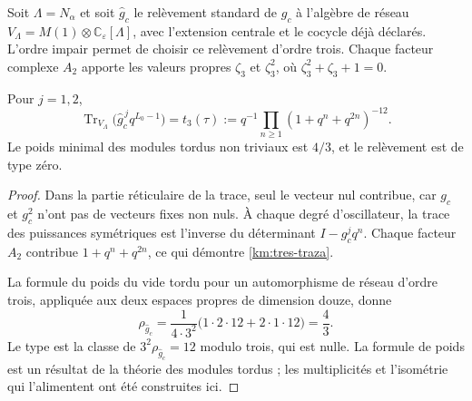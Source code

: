 Soit \(\Lambda=N_\alpha\) et soit \(\widehat g_c\) le relèvement
standard de \(g_c\) à l'algèbre de réseau
\(V_\Lambda=M(1)\otimes\mathbb C_\varepsilon[\Lambda]\), avec
l'extension centrale et le cocycle déjà déclarés. L'ordre impair permet
de choisir ce relèvement d'ordre trois. Chaque facteur complexe \(A_2\)
apporte les valeurs propres \(\zeta_3\) et \(\zeta_3^2\), où
\(\zeta_3^2+\zeta_3+1=0\).

\begin{proposition}
\label{km:traza-tipo}
Pour \(j=1,2\),
\begin{equation}
 \operatorname{Tr}_{V_\Lambda}
       \bigl(\widehat g_c^{\,j}q^{L_0-1}\bigr)
 =t_3(\tau)
 :=q^{-1}\prod_{n\ge1}(1+q^n+q^{2n})^{-12}.
 \label{km:tres-traza}
\end{equation}
Le poids minimal des modules tordus non triviaux est \(4/3\), et
le relèvement est de type zéro.
\end{proposition}
\begin{proof}
Dans la partie réticulaire de la trace, seul le vecteur nul contribue,
car \(g_c\) et \(g_c^2\) n'ont pas de vecteurs fixes non nuls.
À chaque degré d'oscillateur, la trace des puissances symétriques est l'inverse
du déterminant \(I-g_c^jq^n\). Chaque facteur \(A_2\) contribue
\(1+q^n+q^{2n}\), ce qui démontre \eqref{km:tres-traza}.

La formule du poids du vide tordu pour un automorphisme de réseau d'ordre trois, appliquée aux deux espaces propres de dimension douze, donne
\[
 \rho_{\widehat g_c}
 =\frac{1}{4\cdot3^2}
   \bigl(1\cdot2\cdot12+2\cdot1\cdot12\bigr)=\frac43.
\]
Le type est la classe de \(3^2\rho_{\widehat g_c}=12\) modulo
trois, qui est nulle. La formule de poids est un résultat de la théorie des
modules tordus ; les multiplicités et l'isométrie qui l'alimentent
ont été construites ici.
\end{proof}

